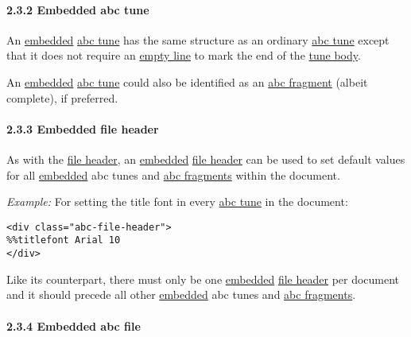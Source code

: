 \hypertarget{embedded_abc_tune}{\paragraph{2.3.2 Embedded abc
tune}\label{embedded_abc_tune}}

An \protect\hyperlink{embedded_definition}{embedded}
\protect\hyperlink{abc_tune_definition}{abc tune} has the same structure
as an ordinary \protect\hyperlink{abc_tune_definition}{abc tune} except
that it does not require an
\protect\hyperlink{empty_line_definition}{empty line} to mark the end of
the \protect\hyperlink{tune_body_definition}{tune body}.

An \protect\hyperlink{embedded_definition}{embedded}
\protect\hyperlink{abc_tune_definition}{abc tune} could also be
identified as an \protect\hyperlink{abc_fragment_definition}{abc
fragment} (albeit complete), if preferred.

\hypertarget{embedded_file_header}{\paragraph{2.3.3 Embedded file
header}\label{embedded_file_header}}

As with the \protect\hyperlink{file_header_definition}{file header}, an
\protect\hyperlink{embedded_definition}{embedded}
\protect\hyperlink{file_header_definition}{file header} can be used to
set default values for all
\protect\hyperlink{embedded_definition}{embedded} abc tunes and
\protect\hyperlink{abc_fragment_definition}{abc fragments} within the
document.

\emph{Example:} For setting the title font in every
\protect\hyperlink{abc_tune_definition}{abc tune} in the document:

\begin{verbatim}
<div class="abc-file-header">
%%titlefont Arial 10
</div>
\end{verbatim}

Like its counterpart, there must only be one
\protect\hyperlink{embedded_definition}{embedded}
\protect\hyperlink{file_header_definition}{file header} per document and
it should precede all other
\protect\hyperlink{embedded_definition}{embedded} abc tunes and
\protect\hyperlink{abc_fragment_definition}{abc fragments}.

\hypertarget{embedded_abc_file}{\paragraph{2.3.4 Embedded abc
file}\label{embedded_abc_file}}

